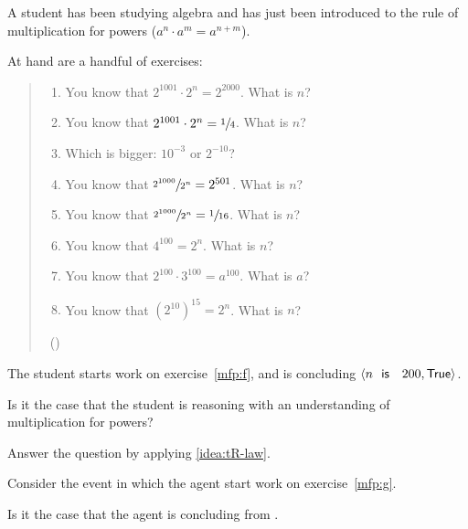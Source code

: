 \begin{note}
  \begin{scenario}
    \label{illu:tR:powers}
    A student has been studying algebra and has just been introduced to the rule of multiplication for powers (\(a^{n} \cdot a^{m} = a^{n + m}\)).

    At hand are a handful of exercises:

    \begin{quote}
      \begin{enumerate}[label=(\alph*), ref=(\alph*)]
      \item
        \label{mfp:a}
        You know that \(2^{1001} \cdot 2^{n} = 2^{2000}\).
        What is \(n\)?
      \item
        \label{mfp:b}
        You know that \(2^{1001} \cdot 2^{n} = \sfrac{1}{4}\).
        What is \(n\)?
      \item
        \label{mfp:c}
        Which is bigger: \(10^{-3}\) or \(2^{-10}\)?
      \item
        \label{mfp:d}
        You know that \(\sfrac{2^{1000}}{2^{n}} = 2^{501}\).
        What is \(n\)?
      \item
        \label{mfp:e}
        You know that \(\sfrac{2^{1000}}{2^{n}} = \sfrac{1}{16}\).
        What is \(n\)?
      \item
        \label{mfp:f}
        You know that \(4^{100} = 2^{n}\).
        What is \(n\)?
      \item
        \label{mfp:g}
        You know that \(2^{100} \cdot 3^{100} = a^{100}\).
        What is \(a\)?
      \item
        \label{mfp:h}
        You know that \((2^{10})^{15} = 2^{n}\).
        What is \(n\)?
      \end{enumerate}
      \mbox{ }\hfill\mbox{(\cite[32]{Gelfand:1993aa})}
    \end{quote}

    The student starts work on exercise~\ref{mfp:f}, and is concluding \(\pv{n\propI{ is }200}{\valI{True}}\).
  \end{scenario}

  Is it the case that the student is reasoning with an understanding of multiplication for powers?

  Answer the question by applying \autoref{idea:tR-law}.

  Consider the event in which the agent start work on exercise~\ref{mfp:g}.

  Is it the case that the agent is concluding  from .


\end{note}
